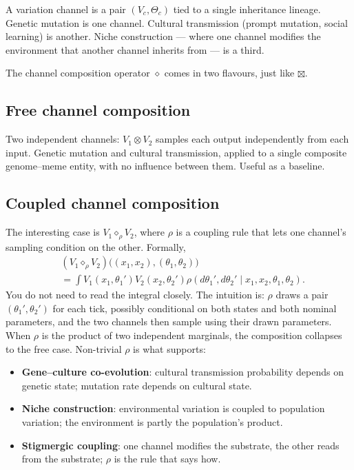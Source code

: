 A variation channel is a pair $(V_c, \Theta_c)$ tied to a single
inheritance lineage. Genetic mutation is one channel. Cultural
transmission (prompt mutation, social learning) is another. Niche
construction --- where one channel modifies the environment that
another channel inherits from --- is a third.

The channel composition operator $\diamond$ comes in two flavours, just
like $\boxtimes$.

\subsection*{Free channel composition}

Two independent channels: $V_1 \otimes V_2$ samples each output
independently from each input. Genetic mutation and cultural
transmission, applied to a single composite genome--meme entity, with
no influence between them. Useful as a baseline.

\subsection*{Coupled channel composition}

The interesting case is $V_1 \diamond_\rho V_2$, where $\rho$ is a
coupling rule that lets one channel's sampling condition on the other.
Formally,
\begin{align*}
  &(V_1 \diamond_\rho V_2)\big((x_1, x_2), (\theta_1, \theta_2)\big) \\
  &= \int V_1(x_1, \theta_1') V_2(x_2, \theta_2')
        \rho(d\theta_1', d\theta_2' \mid x_1, x_2, \theta_1, \theta_2).
\end{align*}
You do not need to read the integral closely. The intuition is: $\rho$
draws a pair $(\theta_1', \theta_2')$ for each tick, possibly
conditional on both states and both nominal parameters, and the two
channels then sample using their drawn parameters. When $\rho$ is the
product of two independent marginals, the composition collapses to the
free case. Non-trivial $\rho$ is what supports:

\begin{itemize}[leftmargin=1.5em,itemsep=2pt]
  \item \textbf{Gene--culture co-evolution}: cultural transmission
    probability depends on genetic state; mutation rate depends on
    cultural state.
  \item \textbf{Niche construction}: environmental variation is coupled
    to population variation; the environment is partly the
    population's product.
  \item \textbf{Stigmergic coupling}: one channel modifies the
    substrate, the other reads from the substrate; $\rho$ is the rule
    that says how.
\end{itemize}

